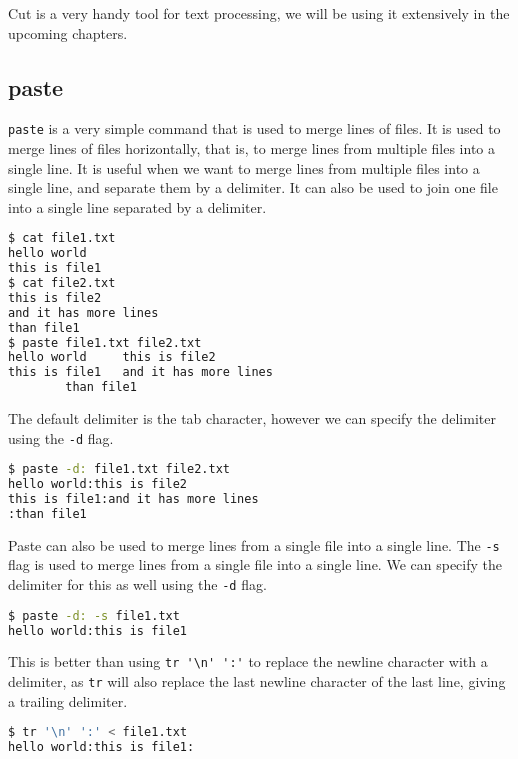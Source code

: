 Cut is a very handy tool for text processing, we will be using it extensively in the upcoming chapters.

\subsection{paste}

\lstinline|paste| is a very simple command that is used to merge lines of files.
It is used to merge lines of files horizontally, that is, to merge lines from multiple files into a single line. It is useful when we want to merge lines from multiple files into a single line, and separate them by a delimiter. It can also be used to join one file into a single line separated by a delimiter.

\begin{lstlisting}[language=bash]
$ cat file1.txt
hello world
this is file1
$ cat file2.txt
this is file2
and it has more lines
than file1
$ paste file1.txt file2.txt
hello world     this is file2
this is file1   and it has more lines
        than file1
\end{lstlisting}

The default delimiter is the tab character, however we can specify the delimiter using the \lstinline|-d| flag.

\begin{lstlisting}[language=bash]
$ paste -d: file1.txt file2.txt
hello world:this is file2
this is file1:and it has more lines
:than file1
\end{lstlisting}

Paste can also be used to merge lines from a single file into a single line.
The \lstinline|-s| flag is used to merge lines from a single file into a single line.
We can specify the delimiter for this as well using the \lstinline|-d| flag.

\begin{lstlisting}[language=bash]
$ paste -d: -s file1.txt
hello world:this is file1
\end{lstlisting}

This is better than using \lstinline|tr '\n' ':'| to replace the newline character with a delimiter, as \lstinline|tr| will also replace the last newline character of the last line, giving a trailing delimiter.

\begin{lstlisting}[language=bash]
$ tr '\n' ':' < file1.txt
hello world:this is file1:
\end{lstlisting}

